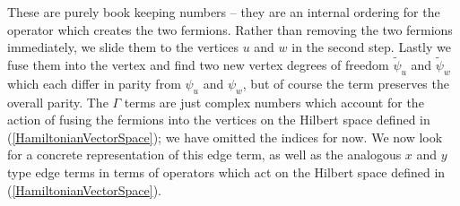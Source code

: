 \documentclass[12pt,a4paper]{article}
\begin{document}
These are purely book keeping numbers -- they are an internal ordering for the operator which creates the two fermions.
Rather than removing the two fermions immediately, we slide them to the vertices $u$ and $w$ in the second step. 
Lastly we fuse them into the vertex and find two new vertex degrees of freedom $\widetilde{\psi}_u$ and $\widetilde{\psi}_w$ which each differ in parity from $\psi_u$ and $\psi_w$, but of course the term preserves the overall parity.
The $\Gamma$ terms are just complex numbers which account for the action of fusing the fermions into the vertices on the Hilbert space defined in (\ref{HamiltonianVectorSpace}); we have omitted the indices for now.
We now look for a concrete representation of this edge term, as well as the analogous $x$ and $y$ type edge terms in terms of operators which act on the Hilbert space defined in (\ref{HamiltonianVectorSpace}).
\end{document}

